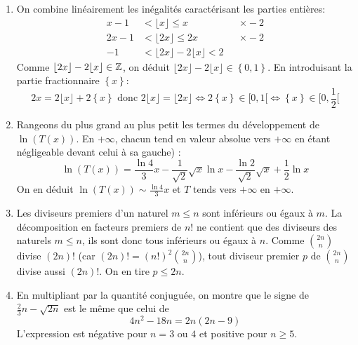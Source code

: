 \begin{enumerate}
  \item On combine linéairement les inégalités  caractérisant les parties entières:
  \begin{align*}
    x - 1  &< \lfloor x \rfloor                       \leq x & &\times -2 \\
    2x - 1 &< \lfloor 2x \rfloor                      \leq 2x & &\times -2 \\ 
    -1     &< \lfloor 2x \rfloor -2 \lfloor x \rfloor < 2
  \end{align*}
Comme $\lfloor 2x \rfloor -2 \lfloor x \rfloor \in \mathbb{Z}$, on déduit $\lfloor 2x \rfloor -2 \lfloor x \rfloor\in \left\lbrace 0,1\right\rbrace$. En introduisant la partie fractionnaire $\left\lbrace x \right\rbrace$:
\begin{displaymath}
2x = 2\lfloor x \rfloor + 2 \left\lbrace x \right\rbrace \text{ donc }  2\lfloor x \rfloor = \lfloor 2x \rfloor
\Leftrightarrow 2 \left\lbrace x \right\rbrace \in [0,1 [ \Leftrightarrow \left\lbrace x \right\rbrace \in [0, \frac{1}{2}[
\end{displaymath}

  \item Rangeons du plus grand au plus petit les termes du développement de $\ln(T(x))$. En $+\infty$, chacun tend en valeur absolue vers $+\infty$ en étant négligeable devant celui à sa gauche) :
\begin{displaymath}
  \ln(T(x)) = \frac{\ln 4 }{3} x  -\frac{1}{\sqrt{2}}\sqrt{x} \ln x - \frac{\ln 2}{\sqrt{2}} \sqrt{x}  + \frac{1}{2} \ln x
\end{displaymath}
On en déduit $\ln(T(x)) \sim \frac{\ln 4 }{3} x$ et $T$ tends vers $+\infty$ en $+\infty$.

  \item Les diviseurs premiers d'un naturel $m\leq n$ sont inférieurs ou égaux à $m$. La décomposition en facteurs premiers de $n!$ ne contient que des diviseurs des naturels $m\leq n$, ils sont donc tous inférieurs ou égaux à $n$.\newline
  Comme $\binom{2n}{n}$ divise $(2n)!$ (car $(2n)!= (n!)^2 \binom{2n}{n}$), tout diviseur premier $p$ de $\binom{2n}{n}$ divise aussi $(2n)!$. On en tire $p\leq 2n$.
  
  \item En multipliant par la quantité conjuguée, on montre que le signe de $\frac{2}{3}n - \sqrt{2n}$ est le même que celui de 
\begin{displaymath}
  4n^2 - 18n = 2n(2n-9)
\end{displaymath}
L'expression est négative pour $n=3$ ou $4$ et positive pour $n\geq 5$.
\end{enumerate}

